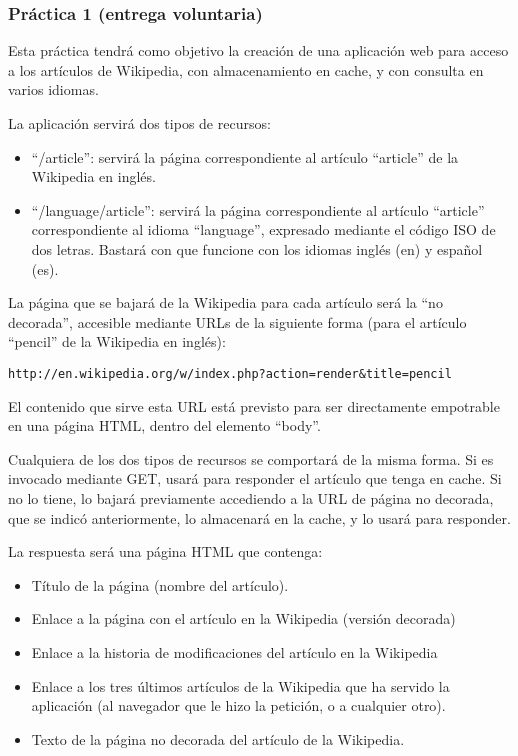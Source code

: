 \subsubsection{Práctica 1 (entrega voluntaria)}
\label{subsec:practica-vol-1-2010}

Esta práctica tendrá como objetivo la creación de una aplicación web para acceso a los artículos de Wikipedia, con almacenamiento en cache, y con consulta en varios idiomas.

La aplicación servirá dos tipos de recursos:

\begin{itemize}
\item ``/article'': servirá la página correspondiente al artículo ``article'' de la Wikipedia en inglés.
\item ``/language/article'': servirá la página correspondiente al artículo ``article'' correspondiente al idioma ``language'', expresado mediante el código ISO de dos letras. Bastará con que funcione con los idiomas inglés (en) y español (es).
\end{itemize}

La página que se bajará de la Wikipedia para cada artículo será la ``no decorada'', accesible mediante URLs de la siguiente forma (para el artículo ``pencil'' de la Wikipedia en inglés):

\begin{verbatim}
http://en.wikipedia.org/w/index.php?action=render&title=pencil
\end{verbatim}

El contenido que sirve esta URL está previsto para ser directamente empotrable en una página HTML, dentro del elemento ``body''.

Cualquiera de los dos tipos de recursos se comportará de la misma forma. Si es invocado mediante GET, usará para responder el artículo que tenga en cache. Si no lo tiene, lo bajará previamente accediendo a la URL de página no decorada, que se indicó anteriormente, lo almacenará en la cache, y lo usará para responder.

La respuesta será una página HTML que contenga:

\begin{itemize}
\item Título de la página (nombre del artículo).
\item Enlace a la página con el artículo en la Wikipedia (versión decorada)
\item Enlace a la historia de modificaciones del artículo en la Wikipedia
\item Enlace a los tres últimos artículos de la Wikipedia que ha servido la aplicación (al navegador que le hizo la petición, o a cualquier otro).
\item Texto de la página no decorada del artículo de la Wikipedia.
\end{itemize}

